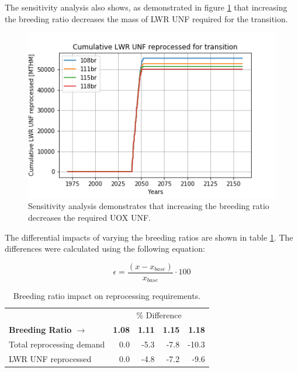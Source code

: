 The sensitivity analysis also shows, as demonstrated in figure \ref{fig:br_uox} that 
increasing the breeding ratio decreases the mass of \gls{LWR} \gls{UNF} 
required for the transition.

\begin{figure}[htbp!]
    \begin{center}
        \includegraphics[scale=0.6]{./images/sensitivity/br_uox_unf_cum.png}
    \end{center}
    \caption{Sensitivity analysis demonstrates that increasing the breeding 
    ratio decreases the required \gls{UOX} \gls{UNF}. }
    \label{fig:br_uox}
\end{figure}

The differential impacts of varying the breeding ratios are
shown in table \ref{tab:br_diff}. The differences were calculated
using the following equation:

\[ \epsilon = \frac{(x - x_{base})}{x_{base}} \cdot 100 \]

\begin{table}[h]
	\centering
        \caption{Breeding ratio impact on reprocessing requirements.}
	\begin{tabular}{lrrrr}
		\hline
                & \multicolumn{4}{c}{\% Difference} \\
		\textbf{Breeding Ratio $\longrightarrow$}& \textbf{1.08}& \textbf{1.11} & \textbf{1.15} & \textbf{1.18} \\
		\hline
		Total reprocessing demand & 0.0 & -5.3 & -7.8 & -10.3 \\ 
		\gls{LWR} \gls{UNF} reprocessed & 0.0  & -4.8 & -7.2 & -9.6 \\
		\hline
	\end{tabular}
	\label{tab:br_diff}
\end{table}


